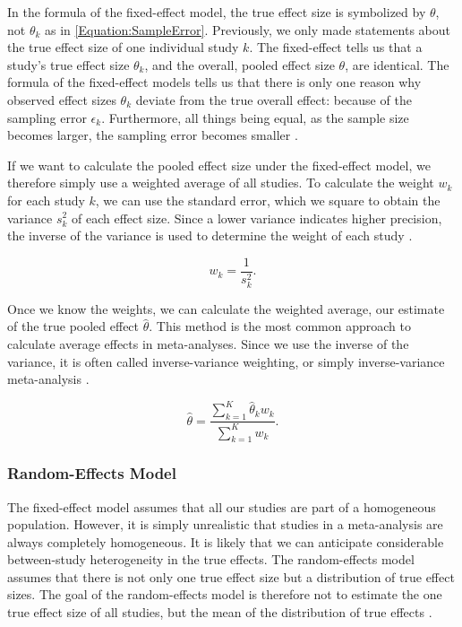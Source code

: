 \documentclass[../../../main.tex]{subfiles}
\begin{document}
In the formula of the fixed-effect model, the true effect size is symbolized by $\theta$, not $\theta_k$ as in \autoref{Equation:SampleError}. Previously, we only made statements about the true effect size of one individual study $k$. The fixed-effect tells us that a study's true effect size $\theta_k$, and the overall, pooled effect size $\theta$, are identical. The formula of the fixed-effect models tells us that there is only one reason why observed effect sizes $\theta_k$ deviate from the true overall effect: because of the sampling error $\epsilon_k$. Furthermore, all things being equal, as the sample size becomes larger, the sampling error becomes smaller \autocite{Harrer2021}.

If we want to calculate the pooled effect size under the fixed-effect model, we therefore simply use a weighted average of all studies. To calculate the weight $w_k$ for each study $k$, we can use the standard error, which we square to obtain the variance $s_k^2$ of each effect size. Since a lower variance indicates higher precision, the inverse of the variance is used to determine the weight of each study \autocite{Harrer2021}.

\begin{equation}
w_k = \frac{1}{s_k^2}.
\end{equation}

Once we know the weights, we can calculate the weighted average, our estimate of the true pooled effect $\hat{\theta}$. This method is the most common approach to calculate average effects in meta-analyses. Since we use the inverse of the variance, it is often called inverse-variance weighting, or simply inverse-variance meta-analysis \autocite{Harrer2021}.

\begin{equation}
\hat{\theta} = \frac{\sum_{k=1}^{K}\hat{\theta}_kw_k}{\sum_{k=1}^{K}w_k}.
\end{equation}

\subsubsection{Random-Effects Model}

The fixed-effect model assumes that all our studies are part of a homogeneous population. However, it is simply unrealistic that studies in a meta-analysis are always completely homogeneous. It is likely that we can anticipate considerable between-study heterogeneity in the true effects. The random-effects model assumes that there is not only one true effect size but a distribution of true effect sizes. The goal of the random-effects model is therefore not to estimate the one true effect size of all studies, but the mean of the distribution of true effects \autocite{Harrer2021}.
\end{document}
